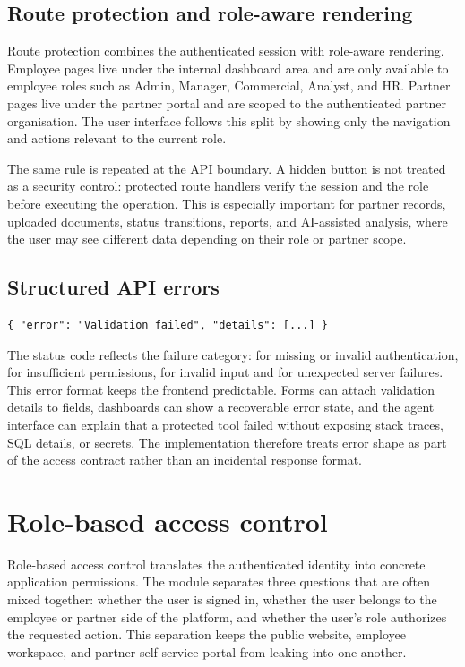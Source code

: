 \subsection{Route protection and role-aware rendering}
Route protection combines the authenticated session with role-aware rendering. Employee pages live under the internal dashboard area and are only available to employee roles such as Admin, Manager, Commercial, Analyst, and HR. Partner pages live under the partner portal and are scoped to the authenticated partner organisation. The user interface follows this split by showing only the navigation and actions relevant to the current role.

The same rule is repeated at the API boundary. A hidden button is not treated as a security control: protected route handlers verify the session and the role before executing the operation. This is especially important for partner records, uploaded documents, status transitions, reports, and AI-assisted analysis, where the user may see different data depending on their role or partner scope.
\subsection{Structured API errors}
\begin{verbatim}
{ "error": "Validation failed", "details": [...] }
\end{verbatim}
The status code reflects the failure category:  for missing or invalid authentication,  for insufficient permissions,  for invalid input and  for unexpected server failures.
This error format keeps the frontend predictable. Forms can attach validation details to fields, dashboards can show a recoverable error state, and the agent interface can explain that a protected tool failed without exposing stack traces, SQL details, or secrets. The implementation therefore treats error shape as part of the access contract rather than an incidental response format.
\section{Role-based access control}
Role-based access control translates the authenticated identity into concrete application permissions. The module separates three questions that are often mixed together: whether the user is signed in, whether the user belongs to the employee or partner side of the platform, and whether the user's role authorizes the requested action. This separation keeps the public website, employee workspace, and partner self-service portal from leaking into one another.
